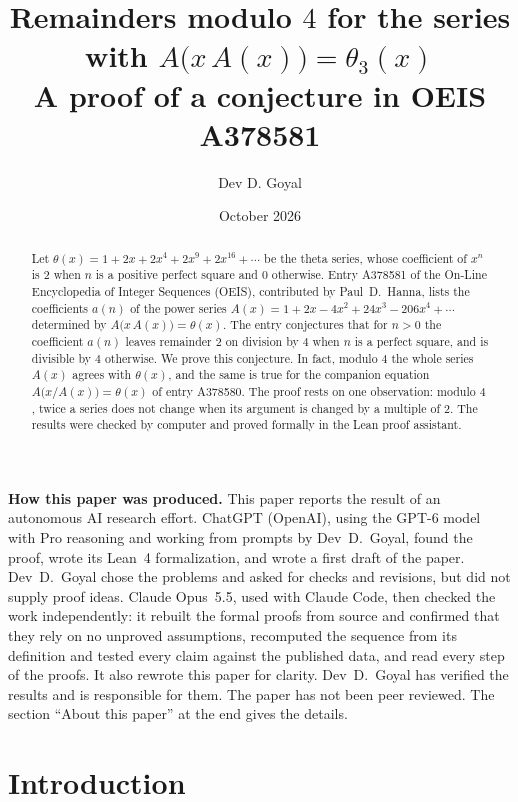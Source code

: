 \documentclass[11pt,a4paper]{article}
\title{Remainders modulo $4$ for the series with $A\bigl(x\,A(x)\bigr)=\theta_3(x)$\\[6pt]\large A proof of a conjecture in OEIS A378581}
\author{Dev D. Goyal}
\date{October 2026}
\theoremstyle{definition}
\theoremstyle{remark}
\begin{document}
\maketitle
\begin{abstract}
Let $\theta(x)=1+2x+2x^4+2x^9+2x^{16}+\cdots$ be the theta series, whose coefficient of $x^n$ is $2$ when $n$ is a
positive perfect square and $0$ otherwise. Entry A378581 of the On-Line Encyclopedia of Integer Sequences (OEIS),
contributed by Paul~D.~Hanna, lists the coefficients $a(n)$ of the power series $A(x)=1+2x-4x^2+24x^3-206x^4+\cdots$
determined by $A\bigl(x\,A(x)\bigr)=\theta(x)$. The entry conjectures that for $n>0$ the coefficient $a(n)$ leaves remainder $2$ on
division by $4$ when $n$ is a perfect square, and is divisible by $4$ otherwise. We prove this conjecture. In fact,
modulo $4$ the whole series $A(x)$ agrees with $\theta(x)$, and the same is true for the companion equation
$A\bigl(x/A(x)\bigr)=\theta(x)$ of entry A378580. The proof rests on one observation: modulo $4$, twice a series
does not change when its argument is changed by a multiple of $2$. The results were checked by computer and proved
formally in the Lean proof assistant.
\end{abstract}
\begin{center}\begin{minipage}{0.88\linewidth}\small
\textbf{How this paper was produced.} This paper reports the result of an autonomous AI research effort.
ChatGPT (OpenAI), using the GPT-6 model with Pro reasoning and working from prompts by Dev~D.~Goyal, found the proof, wrote its Lean~4 formalization, and wrote a first draft of the paper.
Dev~D.~Goyal chose the problems and asked for checks and revisions, but did not supply proof ideas.
Claude Opus~5.5, used with Claude Code, then checked the work independently: it rebuilt the formal proofs from
source and confirmed that they rely on no unproved assumptions, recomputed the sequence from its definition and tested
every claim against the published data, and read every step of the proofs. It also rewrote this paper for clarity.
Dev~D.~Goyal has verified the results and is responsible for them. The paper has not been peer reviewed.
The section ``About this paper'' at the end gives the details.
\end{minipage}\end{center}

\section{Introduction}
\end{document}
